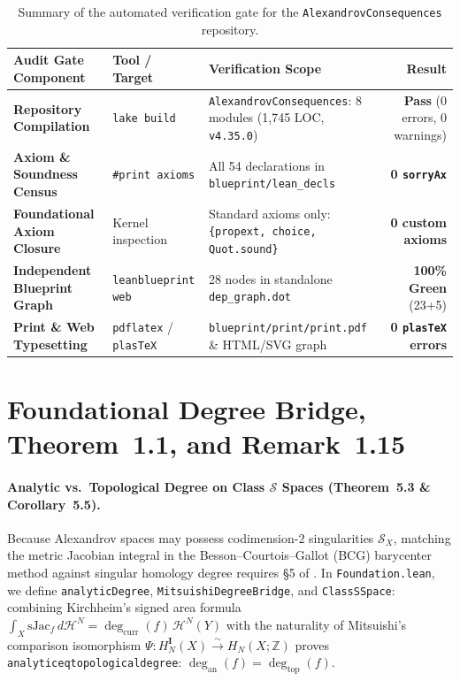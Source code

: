 \documentclass[10pt]{article}
\renewcommand{\_}{\origus\allowbreak}
\newcommand{\Z}{\mathbb{Z}}
\newcommand{\code}[1]{\texttt{#1}}
\newcommand{\NModules}{8}
\newcommand{\NLines}{1{,}745}
\newcommand{\NTotalNodes}{28}
\newcommand{\NProvedNodes}{23}
\newcommand{\NDefNodes}{5}
\newcommand{\NLeanDecls}{54}
\newcommand{\NSorryAx}{0}
\begin{document}
\begin{table}[!ht]
\centering\footnotesize
\renewcommand{\arraystretch}{1.10}
\begin{tabularx}{\textwidth}{@{}>{\bfseries}l l X r@{}}
\toprule
Audit Gate Component & Tool / Target & Verification Scope & Result \\
\midrule
Repository Compilation & \code{lake build} & \code{AlexandrovConsequences}: \NModules{} modules (\NLines{} LOC, \nolinkurl{v4.35.0}) & \textbf{Pass} (0 errors, 0 warnings) \\
Axiom \& Soundness Census & \code{\#print axioms} & All \NLeanDecls{} declarations in \nolinkurl{blueprint/lean_decls} & \textbf{\NSorryAx{} \code{sorryAx}} \\
Foundational Axiom Closure & Kernel inspection & Standard axioms only: \code{\{propext, choice, Quot.sound\}} & \textbf{0 custom axioms} \\
Independent Blueprint Graph & \code{leanblueprint web} & \NTotalNodes{} nodes in standalone \nolinkurl{dep_graph.dot} & \textbf{100\% Green} (\NProvedNodes{}+\NDefNodes{}) \\
Print \& Web Typesetting & \code{pdflatex} / \code{plasTeX} & \nolinkurl{blueprint/print/print.pdf} \& HTML/SVG graph & \textbf{0 \code{plasTeX} errors} \\
\bottomrule
\end{tabularx}
\caption{Summary of the automated verification gate for the \code{AlexandrovConsequences} repository.}
\label{tab:audit}
\end{table}

\section{Foundational Degree Bridge, Theorem~1.1, and Remark~1.15}

\paragraph{Analytic vs.\ Topological Degree on Class $\mathcal{S}$ Spaces (Theorem~5.3 \& Corollary~5.5).}
Because Alexandrov spaces may possess codimension-$2$ singularities $\mathcal{S}_X$, matching the
metric Jacobian integral in the Besson--Courtois--Gallot (BCG) barycenter method \cite{BCG95}
against singular homology degree requires \S5 of \cite{SuarezSerrato2026Alex}. In
\code{Foundation.lean}, we define \code{analyticDegree}, \code{MitsuishiDegreeBridge}, and
\code{ClassSSpace}: combining Kirchheim's signed area formula
$\int_X \mathrm{sJac}_f\,d\mathcal{H}^N = \deg_{\mathrm{curr}}(f)\,\mathcal{H}^N(Y)$ with the
naturality of Mitsuishi's comparison isomorphism $\Psi : H_N^{\mathbf{I}}(X) \xrightarrow{\sim}
H_N(X;\Z)$ \cite{Mitsuishi19} proves \code{analytic\_eq\_topological\_degree}:
$\deg_{\mathrm{an}}(f) = \deg_{\mathrm{top}}(f)$.
\end{document}
